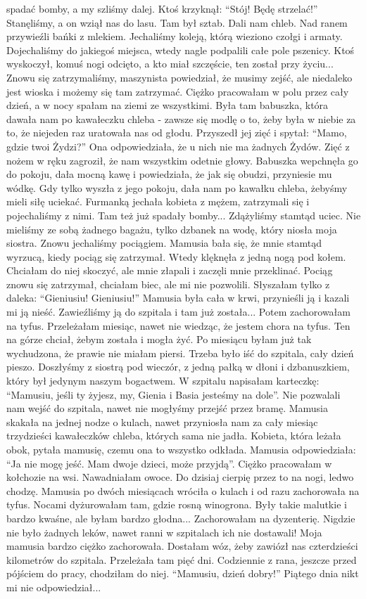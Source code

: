 \begin{otherlanguage}{polish}
spadać bomby, a my szliśmy dalej. Ktoś krzyknął: "`Stój! Będę strzelać!"' Stanęliśmy, a on wziął nas do lasu. Tam był sztab. Dali nam chleb. Nad ranem przywieźli bańki z mlekiem. Jechaliśmy koleją, którą wieziono czołgi i armaty. Dojechaliśmy do jakiegoś miejsca, wtedy nagle podpalili całe pole pszenicy. Ktoś wyskoczył, komuś nogi odcięto, a kto miał szczęście, ten został przy życiu... Znowu się zatrzymaliśmy, maszynista powiedział, że musimy zejść, ale niedaleko jest wioska i możemy się tam zatrzymać. Ciężko pracowałam w polu przez cały dzień, a w nocy spałam na ziemi ze wszystkimi. Była tam babuszka, która dawała nam po kawałeczku chleba - zawsze się modlę o to, żeby była w niebie za to, że niejeden raz uratowała nas od głodu. Przyszedł jej zięć i spytał: "`Mamo, gdzie twoi Żydzi?"' Ona odpowiedziała, że u nich nie ma żadnych Żydów. Zięć z nożem w ręku zagroził, że nam wszystkim odetnie głowy. Babuszka wepchnęła go do pokoju, dała mocną kawę i powiedziała, że jak się obudzi, przyniesie mu wódkę. Gdy tylko wyszła z jego pokoju, dała nam po kawałku chleba, żebyśmy mieli siłę uciekać. Furmanką jechała kobieta z mężem, zatrzymali się i pojechaliśmy z nimi. Tam też już spadały bomby... Zdążyliśmy stamtąd uciec. Nie mieliśmy ze sobą żadnego bagażu, tylko dzbanek na wodę, który niosła moja siostra. Znowu jechaliśmy pociągiem. Mamusia bała się, że mnie stamtąd wyrzucą, kiedy pociąg się zatrzymał. Wtedy klęknęła z jedną nogą pod kołem. Chciałam do niej skoczyć, ale mnie złapali i zaczęli mnie przeklinać. Pociąg znowu się zatrzymał, chciałam biec, ale mi nie pozwolili. Słyszałam tylko z daleka: "`Gieniusiu! Gieniusiu!"' Mamusia była cała w krwi, przynieśli ją i kazali mi ją nieść. Zawieźliśmy ją do szpitala i tam już została...  Potem zachorowałam na tyfus. Przeleżałam miesiąc, nawet nie wiedząc, że jestem chora na tyfus. Ten na górze chciał, żebym została i mogła żyć. Po miesiącu byłam już tak wychudzona, że prawie nie miałam piersi. Trzeba było iść do szpitala, cały dzień pieszo. Doszłyśmy z siostrą pod wieczór, z jedną pałką w dłoni i dzbanuszkiem, który był jedynym naszym bogactwem. W szpitalu napisałam karteczkę: "`Mamusiu, jeśli ty żyjesz, my, Gienia i Basia jesteśmy na dole"'. Nie pozwalali nam wejść do szpitala, nawet nie mogłyśmy przejść przez bramę. Mamusia skakała na jednej nodze o kulach, nawet przyniosła nam za cały miesiąc trzydzieści kawałeczków chleba, których sama nie jadła. Kobieta, która leżała obok, pytała mamusię, czemu ona to wszystko odkłada.  Mamusia odpowiedziała: "`Ja nie mogę jeść. Mam dwoje dzieci, może przyjdą"'.
Ciężko pracowałam w kołchozie na wsi. Nawadniałam owoce. Do dzisiaj cierpię przez to na nogi, ledwo chodzę. Mamusia po dwóch miesiącach wróciła o kulach i od razu zachorowała na tyfus. Nocami dyżurowałam tam, gdzie rosną winogrona. Były takie malutkie i bardzo kwaśne, ale byłam bardzo głodna... Zachorowałam na dyzenterię. Nigdzie nie było żadnych leków, nawet ranni w szpitalach ich nie dostawali! Moja mamusia bardzo ciężko zachorowała. Dostałam wóz, żeby zawiózł nas czterdzieści kilometrów do szpitala. Przeleżała tam pięć dni. Codziennie z rana, jeszcze przed pójściem do pracy, chodziłam do niej. "`Mamusiu, dzień dobry!"' Piątego dnia nikt mi nie odpowiedział...

\end{otherlanguage}
